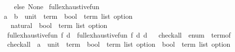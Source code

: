 \begin{isabellebody}
\ \ \ \ \ else\ None{\isacharparenright}{\kern0pt}{\isachardoublequoteclose}\isanewline
\isanewline
{}\isamarkupfalse%
\ full{\isacharunderscore}{\kern0pt}exhaustive{\isacharunderscore}{\kern0pt}fun\ {\isacharcolon}{\kern0pt}{\isacharcolon}{\kern0pt}\isanewline
\ \ {\isachardoublequoteopen}{\isacharparenleft}{\kern0pt}{\isacharparenleft}{\kern0pt}{\isacharprime}{\kern0pt}a\ {\isasymRightarrow}\ {\isacharprime}{\kern0pt}b{\isacharparenright}{\kern0pt}\ {\isasymtimes}\ {\isacharparenleft}{\kern0pt}unit\ {\isasymRightarrow}\ term{\isacharparenright}{\kern0pt}\ {\isasymRightarrow}\ {\isacharparenleft}{\kern0pt}bool\ {\isasymtimes}\ term\ list{\isacharparenright}{\kern0pt}\ option{\isacharparenright}{\kern0pt}\ {\isasymRightarrow}\isanewline
\ \ \ \ natural\ {\isasymRightarrow}\ {\isacharparenleft}{\kern0pt}bool\ {\isasymtimes}\ term\ list{\isacharparenright}{\kern0pt}\ option{\isachardoublequoteclose}\isanewline
\ \ \ {\isachardoublequoteopen}full{\isacharunderscore}{\kern0pt}exhaustive{\isacharunderscore}{\kern0pt}fun\ f\ d\ {\isacharequal}{\kern0pt}\ full{\isacharunderscore}{\kern0pt}exhaustive{\isacharunderscore}{\kern0pt}fun{\isacharprime}{\kern0pt}\ f\ d\ d{\isachardoublequoteclose}\isanewline
\isanewline
{}\isamarkupfalse%
%
\isadelimproof
\ %
\endisadelimproof
%
\isatagproof
\isacommand{{\isachardot}{\kern0pt}{\isachardot}{\kern0pt}}\isamarkupfalse%
%
\endisatagproof
{\isafoldproof}%
%
\isadelimproof
%
\endisadelimproof
\isanewline
\isanewline
{}\isamarkupfalse%
%
\isadelimdocument
%
\endisadelimdocument
%
\isatagdocument
%
\isamarkuptrue%
%
\endisatagdocument
{\isafolddocument}%
%
\isadelimdocument
%
\endisadelimdocument
{}\isamarkupfalse%
\ check{\isacharunderscore}{\kern0pt}all\ {\isacharequal}{\kern0pt}\ enum\ {\isacharplus}{\kern0pt}\ term{\isacharunderscore}{\kern0pt}of\ {\isacharplus}{\kern0pt}\isanewline
\ \ \ check{\isacharunderscore}{\kern0pt}all\ {\isacharcolon}{\kern0pt}{\isacharcolon}{\kern0pt}\ {\isachardoublequoteopen}{\isacharparenleft}{\kern0pt}{\isacharprime}{\kern0pt}a\ {\isasymtimes}\ {\isacharparenleft}{\kern0pt}unit\ {\isasymRightarrow}\ term{\isacharparenright}{\kern0pt}\ {\isasymRightarrow}\ {\isacharparenleft}{\kern0pt}bool\ {\isasymtimes}\ term\ list{\isacharparenright}{\kern0pt}\ option{\isacharparenright}{\kern0pt}\ {\isasymRightarrow}\ {\isacharparenleft}{\kern0pt}bool\ {\isacharasterisk}{\kern0pt}\ term\ list{\isacharparenright}{\kern0pt}\ option{\isachardoublequoteclose}\isanewline

\end{isabellebody}
